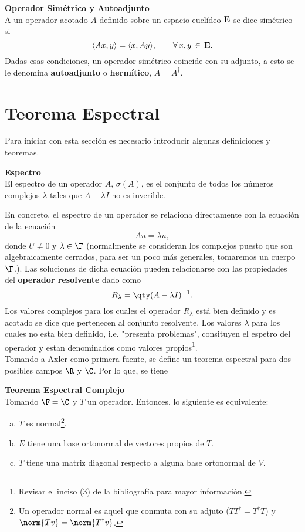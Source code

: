 \begin{mdframed}[style=warning]
	{\large \textbf{Operador Simétrico y Autoadjunto}} \\
	A un operador acotado $A$ definido sobre un espacio euclídeo $\mathbf{E}$ se dice simétrico si
		$$ \langle Ax , y \rangle = \langle x , Ay \rangle, \qquad \forall \, x,y \, \in \, \mathbf{E} . $$
	Dadas esas condiciones, un operador simétrico coincide con su adjunto, a esto se le denomina \textbf{autoadjunto} o \textbf{hermítico}, $A = A^\dagger$.
\end{mdframed}



\section*{Teorema Espectral}
Para iniciar con esta sección es necesario introducir algunas definiciones y teoremas.

\begin{mdframed}[style=warning]
	{\large \textbf{Espectro}} \\
	El espectro de un operador $A$, $\sigma (A)$, es el conjunto de todos los números complejos $\lambda$ tales que $A - \lambda I$ no es inverible.
\end{mdframed}


En concreto, el espectro de un operador se relaciona directamente con la ecuación de la ecuación
	$$ Au = \lambda u, $$
donde $U\neq 0$ y $\lambda \in \F$ (normalmente se consideran los complejos puesto que son algebraicamente cerrados, para ser un poco más generales, tomaremos un cuerpo $\F$.). Las soluciones de dicha ecuación pueden relacionarse con las propiedades del \textbf{operador resolvente} dado como
	$$ R_\lambda = \qty(A - \lambda I)^{-1}. $$
Los valores complejos para los cuales el operador $R_\lambda$ está bien definido y es acotado se dice que pertenecen al conjunto resolvente. Los valores $\lambda$ para los cuales no esta bien definido, i.e. "presenta problemas", consituyen el espetro del operador y estan denominados como valores propios\footnote{Revisar el inciso (3) de la bibliografía para mayor información.}. \\

Tomando a Axler como primera fuente, se define un teorema espectral para dos posibles campos $\R$ y $\C$. Por lo que, se tiene


\begin{mdframed}[style=warning]
	{\large \textbf{Teorema Espectral Complejo}} \\
	Tomando $\F = \C$ y $T$ un operador. Entonces, lo siguiente es equivalente:
	\begin{enumerate}[a)]
		\item $T$ es normal\footnote{Un operador normal es aquel que conmuta con su adjuto ($TT^\dagger = T^\dagger T$) y $\norm{Tv} = \norm{T^\dagger v}$.}.
		\item $E$ tiene una base ortonormal de vectores propios de $T$.
		\item $T$ tiene una matriz diagonal respecto a alguna base ortonormal de $V$.
	\end{enumerate}
\end{mdframed}




